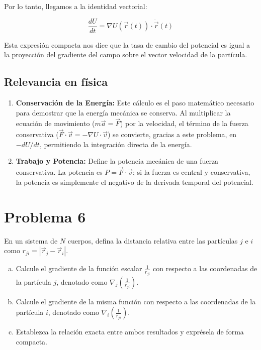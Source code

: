 \documentclass[12pt, letterpaper]{article}
\begin{document}
Por lo tanto, llegamos a la identidad vectorial:

$$ \frac{dU}{dt} = \nabla U(\vec{r}(t)) \cdot \dot{\vec{r}}(t) $$

Esta expresión compacta nos dice que la tasa de cambio del potencial es igual a la proyección del gradiente del campo sobre el vector velocidad de la partícula.

\subsection{Relevancia en física}


\begin{enumerate}
    \item \textbf{Conservación de la Energía:} Este cálculo es el paso matemático necesario para demostrar que la energía mecánica se conserva. Al multiplicar la ecuación de movimiento ($m\vec{a} = \vec{F}$) por la velocidad, el término de la fuerza conservativa ($\vec{F} \cdot \vec{v} = -\nabla U \cdot \vec{v}$) se convierte, gracias a este problema, en $-dU/dt$, permitiendo la integración directa de la energía.
    \item \textbf{Trabajo y Potencia:} Define la potencia mecánica de una fuerza conservativa. La potencia es $P = \vec{F} \cdot \vec{v}$; si la fuerza es central y conservativa, la potencia es simplemente el negativo de la derivada temporal del potencial.
\end{enumerate}


\section{Problema 6}

En un sistema de $N$ cuerpos, defina la distancia relativa entre las partículas $j$ e $i$ como $r_{ji} = |\vec{r}_j - \vec{r}_i|$.

\begin{enumerate}[a)]
    \item Calcule el gradiente de la función escalar $\frac{1}{r_{ji}}$ con respecto a las coordenadas de la partícula $j$, denotado como $\nabla_j \left( \frac{1}{r_{ji}} \right)$.
    \item Calcule el gradiente de la misma función con respecto a las coordenadas de la partícula $i$, denotado como $\nabla_i \left( \frac{1}{r_{ji}} \right)$.
    \item Establezca la relación exacta entre ambos resultados y exprésela de forma compacta.
\end{enumerate}
\end{document}
